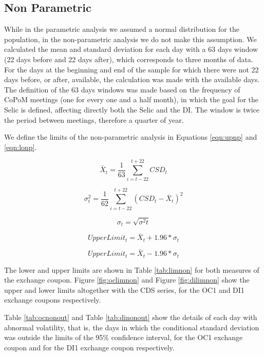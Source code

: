 \documentclass[cic,tc, english]{iiufrgs}
\begin{document}
\subsection{Non Parametric}

    While in the parametric analysis we assumed a normal distribution for the population, in the non-parametric analysis we do not make this assumption. We calculated the mean and standard deviation for each day with a 63 days window (22 days before and 22 days after), which corresponds to three months of data. For the days at the beginning and end of the sample for which there were not 22 days before, or after, available, the calculation was made with the available days. The definition of the 63 days windows was made based on the frequency of CoPoM meetings (one for every one and a half month), in which the goal for the Selic is defined, affecting directly both the Selic and the DI. The window is twice the period between meetings, therefore a quarter of year.

    We define the limits of the non-parametric analysis in Equations \ref{eqn:upnp} and \ref{eqn:lonp}.

    $$\bar{X}_t = \frac{1}{63} \displaystyle\sum_{i=t-22}^{t+22} CSD_t$$

    $$\sigma^2_t = \frac{1}{62} \displaystyle\sum_{i=t-22}^{t+22} (CSD_t - \bar{X}_t)^2$$

    $$\sigma_t = \sqrt{\sigma^2t}$$

    \begin{equation}
        \label{eqn:upnp}
        UpperLimit_t = \bar{X}_t + 1.96 * \sigma_t
    \end{equation}

    \begin{equation}
        \label{eqn:lonp}
        UpperLimit_t = \bar{X}_t - 1.96 * \sigma_t
    \end{equation}

    The lower and upper limits are shown in Table \ref{tab:limnon} for both measures of the exchange coupon. Figure \ref{fig:oclimnon} and Figure \ref{fig:dilimnon} show the upper and lower limits altogether with the CDS series, for the OC1 and DI1 exchange coupons respectively.

    

    

    

    Table \ref{tab:ocnonout} and Table \ref{tab:dinonout} show the details of each day with abnormal volatility, that is, the days in which the conditional standard deviation was outside the limits of the 95\% confidence interval, for the OC1 exchange coupon and for the DI1 exchange coupon respectively.
\end{document}
